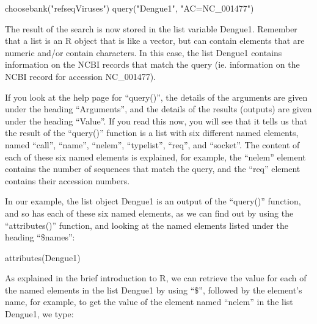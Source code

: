 \documentclass[
]{book}
\newenvironment{Shaded}{\begin{snugshade}}{\end{snugshade}}
\newcommand{\FunctionTok}[1]{\textcolor[rgb]{0.00,0.00,0.00}{#1}}
\newcommand{\NormalTok}[1]{#1}
\newcommand{\SpecialCharTok}[1]{\textcolor[rgb]{0.00,0.00,0.00}{#1}}
\newcommand{\StringTok}[1]{\textcolor[rgb]{0.31,0.60,0.02}{#1}}
\begin{document}
\begin{Shaded}
\begin{Highlighting}[]
\FunctionTok{choosebank}\NormalTok{(}\StringTok{"refseqViruses"}\NormalTok{)}
\FunctionTok{query}\NormalTok{(}\StringTok{"Dengue1"}\NormalTok{, }\StringTok{"AC=NC\_001477"}\NormalTok{)}
\end{Highlighting}
\end{Shaded}

The result of the search is now stored in the list variable Dengue1. Remember that a list is an R object that is like a vector, but can contain elements that are numeric and/or contain characters. In this case, the list Dengue1 contains information on the NCBI records that match the query (ie. information on the NCBI record for accession NC\_001477).

If you look at the help page for ``query()'', the details of the arguments are given under the heading ``Arguments'', and the details of the results (outputs) are given under the heading ``Value''. If you read this now, you will see that it tells us that the result of the ``query()'' function is a list with six different named elements, named ``call'', ``name'', ``nelem'', ``typelist'', ``req'', and ``socket''. The content of each of these six named elements is explained, for example, the ``nelem'' element contains the number of sequences that match the query, and the ``req'' element contains their accession numbers.

In our example, the list object Dengue1 is an output of the ``query()'' function, and so has each of these six named elements, as we can find out by using the ``attributes()'' function, and looking at the named elements listed under the heading ``\$names'':

\begin{Shaded}
\begin{Highlighting}[]
\FunctionTok{attributes}\NormalTok{(Dengue1)}
\end{Highlighting}
\end{Shaded}

As explained in the brief introduction to R, we can retrieve the value for each of the named elements in the list Dengue1 by using ``\$'', followed by the element's name, for example, to get the value of the element named ``nelem'' in the list Dengue1, we type:

\begin{Shaded}
\end{Shaded}
\end{document}
